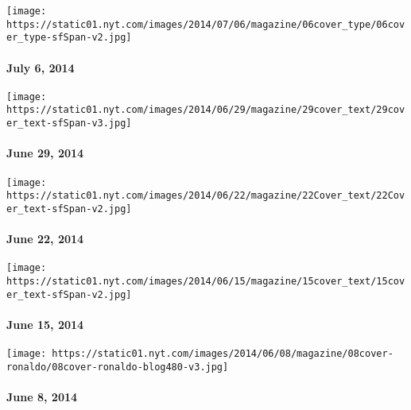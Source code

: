 \href{http://www.nytimes.com/indexes/2014/07/06/magazine/index.html}{}

\texttt{[image: https://static01.nyt.com/images/2014/07/06/magazine/06cover\_type/06cover\_type-sfSpan-v2.jpg]}

\hypertarget{july-6-2014}{%
\paragraph{July 6, 2014}\label{july-6-2014}}

\href{http://www.nytimes.com/indexes/2014/06/29/magazine/index.html}{}

\texttt{[image: https://static01.nyt.com/images/2014/06/29/magazine/29cover\_text/29cover\_text-sfSpan-v3.jpg]}

\hypertarget{june-29-2014}{%
\paragraph{June 29, 2014}\label{june-29-2014}}

\href{http://www.nytimes.com/indexes/2014/06/22/magazine/index.html}{}

\texttt{[image: https://static01.nyt.com/images/2014/06/22/magazine/22Cover\_text/22Cover\_text-sfSpan-v2.jpg]}

\hypertarget{june-22-2014}{%
\paragraph{June 22, 2014}\label{june-22-2014}}

\href{http://www.nytimes.com/indexes/2014/06/15/magazine/index.html}{}

\texttt{[image: https://static01.nyt.com/images/2014/06/15/magazine/15cover\_text/15cover\_text-sfSpan-v2.jpg]}

\hypertarget{june-15-2014}{%
\paragraph{June 15, 2014}\label{june-15-2014}}

\href{http://www.nytimes.com/indexes/2014/06/08/magazine/index.html}{}

\texttt{[image: https://static01.nyt.com/images/2014/06/08/magazine/08cover-ronaldo/08cover-ronaldo-blog480-v3.jpg]}

\hypertarget{june-8-2014}{%
\paragraph{June 8, 2014}\label{june-8-2014}}

